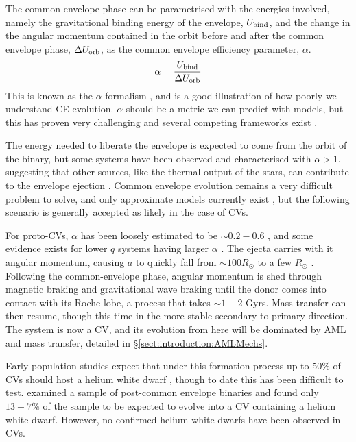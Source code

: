 The common envelope phase can be parametrised with the energies involved, namely the gravitational binding energy of the envelope, $U_{\rm bind}$, and the change in the angular momentum contained in the orbit before and after the common envelope phase, $\Delta U_{\rm orb}$, as the common envelope efficiency parameter, $\alpha$.
\begin{equation}
    \alpha = \frac{U_{\rm bind}}{\Delta U_{\rm orb}}
\end{equation}
This is known as the $\alpha$ formalism \citep{demarco2011}, and is a good illustration of how poorly we understand CE evolution. $\alpha$ should be a metric we can predict with models, but this has proven very challenging and several competing frameworks exist \citep{ivanova2020}.

The energy needed to liberate the envelope is expected to come from the orbit of the binary, but some systems have been observed and characterised with $\alpha > 1$. suggesting that other sources, like the thermal output of the stars, can contribute to the envelope ejection \citep{demarco2011, ivanova2013}. Common envelope evolution remains a very difficult problem to solve, and only approximate models currently exist \citep{ivanova2020}, but the following scenario is generally accepted as likely in the case of CVs.

For proto-CVs, $\alpha$ has been loosely estimated to be $\sim 0.2 - 0.6$ \citep{politano2007}, and some evidence exists for lower $q$ systems having larger $\alpha$ \citep{passy2013}. The ejecta carries with it angular momentum, causing $a$ to quickly fall from $\sim 100 R_\odot$ to a few $R_\odot$ \citep{politano2007}.
Following the common-envelope phase, angular momentum is shed through magnetic braking and gravitational wave braking until the donor comes into contact with its Roche lobe, a process that takes $\sim 1-2$ Gyrs. Mass transfer can then resume, though this time in the more stable secondary-to-primary direction. The system is now a CV, and its evolution from here will be dominated by AML and mass transfer, detailed in \S\ref{sect:introduction:AMLMechs}.

Early population studies expect that under this formation process up to 50\% of CVs should host a helium white dwarf \citep{politano1996}, though to date this has been difficult to test.
\citet{zorotovic2010} examined a sample of post-common envelope binaries and found only $13\pm7\%$ of the sample to be expected to evolve into a CV containing a helium white dwarf. However, no confirmed helium white dwarfs have been observed in CVs.



